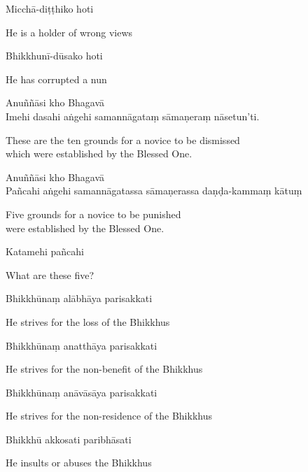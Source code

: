 Micchā-diṭṭhiko hoti

\begin{cprenglish}
  He is a holder of wrong views
\end{cprenglish}

Bhikkhunī-dūsako hoti

\begin{cprenglish}
  He has corrupted a nun
\end{cprenglish}

Anuññāsi kho Bhagavā\\
Imehi dasahi aṅgehi samannāgataṃ sāmaṇeraṃ nāsetun'ti.

\begin{cprenglish}
  These are the ten grounds for a novice to be dismissed\\
  which were established by the Blessed One. 
\end{cprenglish}

Anuññāsi kho Bhagavā\\
Pañcahi aṅgehi samannāgatassa sāmaṇerassa daṇḍa-kammaṃ kātuṃ

\begin{cprenglish}
  Five grounds for a novice to be punished\\
  were established by the Blessed One.
\end{cprenglish}

Katamehi pañcahi

\begin{cprenglish}
  What are these five?
\end{cprenglish}

Bhikkhūnaṃ alābhāya parisakkati

\begin{cprenglish}
  He strives for the loss of the Bhikkhus
\end{cprenglish}

Bhikkhūnaṃ anatthāya parisakkati

\begin{cprenglish}
  He strives for the non-benefit of the Bhikkhus
\end{cprenglish}

Bhikkhūnaṃ anāvāsāya parisakkati

\begin{cprenglish}
  He strives for the non-residence of the Bhikkhus
\end{cprenglish}

Bhikkhū akkosati paribhāsati

\begin{cprenglish}
  He insults or abuses the Bhikkhus
\end{cprenglish}

